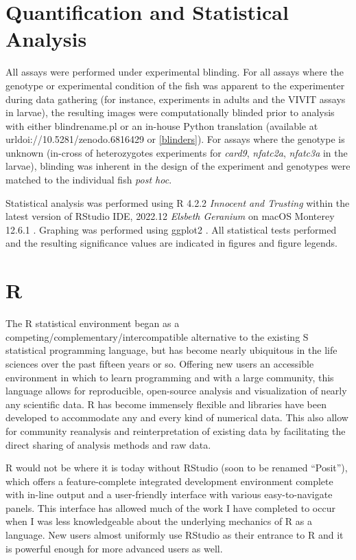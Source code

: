 \section{Quantification and Statistical Analysis}\label{quant:stats}

All assays were performed under experimental blinding. For all assays where the genotype or experimental condition of the fish was apparent to the experimenter during data gathering (for instance, experiments in adults and the VIVIT assays in larvae), the resulting images were computationally blinded prior to analysis with either blindrename.pl \citep{Salter2016} or an in-house Python translation (available at url{doi://10.5281/zenodo.6816429} or \autoref{blinders}). For assays where the genotype is unknown (in-cross of heterozygotes experiments for \textit{card9}, \textit{nfatc2a}, \textit{nfatc3a} in the larvae), blinding was inherent in the design of the experiment and genotypes were matched to the individual fish \textit{post hoc}. 

Statistical analysis was performed using R 4.2.2 \textit{Innocent and Trusting} within the latest version of RStudio IDE, 2022.12 \textit{Elsbeth Geranium} on macOS Monterey 12.6.1 \citep{RCoreTeam2022, RStudioTeam2022}. Graphing was performed using ggplot2 \citep{Wickham2016, Wickham2022b}. All statistical tests performed and the resulting significance values are indicated in figures and figure legends.

\section{R}\label{meth:R}

The R statistical environment began as a competing/complementary/intercompatible alternative to the existing S statistical programming language, but has become nearly ubiquitous in the life sciences over the past fifteen years or so. Offering new users an accessible environment in which to learn programming and with a large community, this language allows for reproducible, open-source analysis and visualization of nearly any scientific data. R has become immensely flexible and libraries have been developed to accommodate any and every kind of numerical data. This also allow for community reanalysis and reinterpretation of existing data by facilitating the direct sharing of analysis methods and raw data. 

R would not be where it is today without RStudio (soon to be renamed ``Posit''), which offers a feature-complete integrated development environment complete with in-line output and a user-friendly interface with various easy-to-navigate panels. This interface has allowed much of the work I have completed to occur when I was less knowledgeable about the underlying mechanics of R as a language. New users almost uniformly use RStudio as their entrance to R and it is powerful enough for more advanced users as well.

